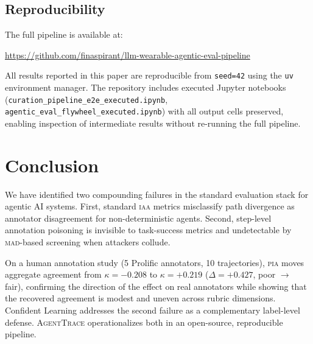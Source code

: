 \documentclass{article}
\newcommand{\PIA}{\textsc{pia}}          %
\newcommand{\AgentTrace}{\textsc{AgentTrace}}
\begin{document}
\subsection{Reproducibility}
\label{sec:agenttrace:repro}

The full pipeline is available at:
\begin{center}
\url{https://github.com/finaspirant/llm-wearable-agentic-eval-pipeline}
\end{center}
All results reported in this paper are reproducible from \texttt{seed=42}
using the \texttt{uv} environment manager.
%
The repository includes executed Jupyter notebooks
(\texttt{curation\_pipeline\_e2e\_executed.ipynb},
\texttt{agentic\_eval\_flywheel\_executed.ipynb}) with all output cells
preserved, enabling inspection of intermediate results without re-running
the full pipeline.

\section{Conclusion}
\label{sec:conclusion}

We have identified two compounding failures in the standard evaluation
stack for agentic AI systems. First, standard \textsc{iaa} metrics
misclassify path divergence as annotator disagreement for non-deterministic
agents. Second, step-level annotation poisoning is invisible to task-success
metrics and undetectable by \textsc{mad}-based screening when attackers collude.

On a human annotation study (5 Prolific annotators, 10 trajectories), \PIA{}
moves aggregate agreement from $\kappa = -0.208$ to $\kappa = +0.219$
($\Delta = +0.427$, poor $\to$ fair), confirming the direction of the effect
on real annotators while showing that the recovered agreement is modest and
uneven across rubric dimensions.
Confident Learning addresses the second failure as a complementary
label-level defense.
\AgentTrace{} operationalizes both in an open-source, reproducible pipeline.
\end{document}
